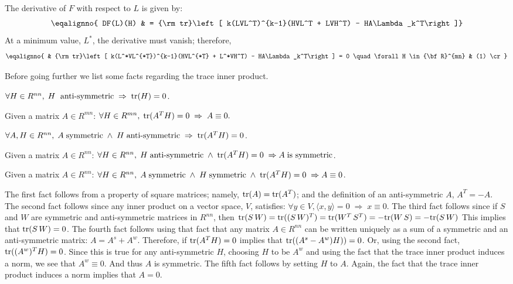 The derivative of $F$ with respect to $L$ is given by:
$$
\eqalignno{
DF(L)(H) & = {\rm tr}\left[ k(LVL^T)^{k-1}(HVL^T + LVH^T) - 
HA\Lambda_k^T\right]}
$$
At a minimum value, $L^*$, the derivative must vanish; therefore,
$$
\eqalignno{
& {\rm tr}\left[ k(L^*VL^{*T})^{k-1}(HVL^{*T} + L^*VH^T) - 
HA\Lambda_k^T\right] = 0
  \quad \forall H \in {\bf R}^{mn} & (1) \cr}
$$

Before going further we list some facts regarding the trace inner product.

\item{$\forall H \in R^{nn},\; H \; \hbox{ anti-symmetric} \; \Rightarrow \; {\rm tr}(H) = 0$.}
\item{Given a matrix $A \in R^{mn}$: $\forall H \in R^{mn},\; {\rm tr}(A^T H) = 0 \; \Rightarrow \; A \equiv 0.$}
\item{$\forall A,H \in R^{nn}, \;A \; {\rm symmetric} \; \wedge \; H \; \hbox{anti-symmetric}\;  \Rightarrow \; {\rm tr}(A^T H) = 0$.}
\item{Given a matrix $A \in R^{nn}$: $\forall H \in R^{nn}, \; H \; \hbox{anti-symmetric} \; \wedge \; {\rm tr}(A^T H) = 0 \; \Rightarrow A \; \hbox{is symmetric}$.}
\item{Given a matrix $A \in R^{nn}$: $\forall H \in R^{nn}, \; A \; \hbox{symmetric} \; \wedge \; H \; \hbox{symmetric} \; \wedge \; {\rm tr}(A^T H) = 0 \; \Rightarrow A \equiv 0$.}

The first fact follows from a property of square matrices; namely,
${\rm tr}(A) = {\rm tr}(A^T)$; and the definition of an anti-symmetric $A$, $A^T = -A$.
The second fact follows since any inner product on a vector space, $V$, satisfies: 
$\forall y \in V, \langle x, y \rangle = 0 \; \Rightarrow \; x \equiv 0$. 
The third fact follows since if $S$ and $W$ are symmetric and anti-symmetric matrices in $R^{nn}$, then
${\rm tr}(S \, W) = {\rm tr}((S \, W)^T) = {\rm tr}(W^T \, S^T) = -{\rm tr}(W \, S) = - {\rm tr}(S\, W)$
This implies that ${\rm tr}(S \, W) = 0$.
The fourth fact follows using that fact that any matrix $A \in R^{nn}$ can be written uniquely as a sum of a symmetric
and an anti-symmetric matrix: $A = A^{s} + A^{w}$. Therefore, if ${\rm tr}(A^T H) = 0$ implies that
${\rm tr}((A^{s} - A^{w}) H)) = 0$. Or, using the second fact, ${\rm tr}((A^w)^T H) = 0$. Since this is true for any
anti-symmetric $H$, choosing $H$ to be $A^{w}$ and using the fact that the trace inner product induces a norm, we 
see that $A^{w} \equiv 0$. And thus $A$ is symmetric.
The fifth fact follows by setting $H$ to $A$. Again, the fact that the trace inner product induces a norm implies 
that $A = 0$.


